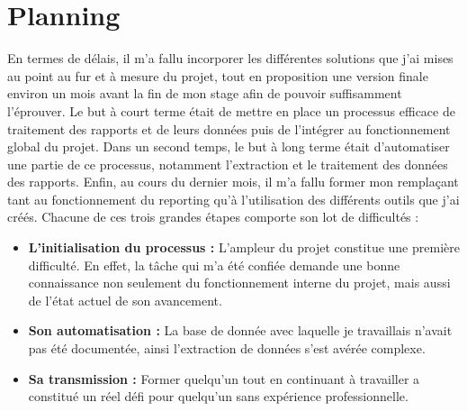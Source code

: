 \section{Planning}
En termes de délais, il m'a fallu incorporer les différentes solutions que j'ai mises au point au fur et à mesure du projet, tout en proposition une version finale environ un mois avant la fin de mon stage afin de pouvoir suffisamment l'éprouver.
Le but à court terme était de mettre en place un processus efficace de traitement des rapports et de leurs données puis de l'intégrer au fonctionnement global du projet.
Dans un second temps, le but à long terme était d'automatiser une partie de ce processus, notamment l'extraction et le traitement des données des rapports.
Enfin, au cours du dernier mois, il m'a fallu former mon remplaçant tant au fonctionnement du \gls{reporting} qu'à l'utilisation des différents outils que j'ai créés.
Chacune de ces trois grandes étapes comporte son lot de difficultés :
\begin{itemize}
\item \textbf{L'initialisation du processus :} L'ampleur du projet constitue une première difficulté. En effet, la tâche qui m'a été confiée demande une bonne connaissance non seulement du fonctionnement interne du projet, mais aussi de l'état actuel de son avancement.
\item \textbf{Son automatisation :} La base de donnée avec laquelle je travaillais n'avait pas été documentée, ainsi l'extraction de données s'est avérée complexe.
\item \textbf{Sa transmission :} Former quelqu'un tout en continuant à travailler a constitué un réel défi pour quelqu'un sans expérience professionnelle.
\end{itemize}
